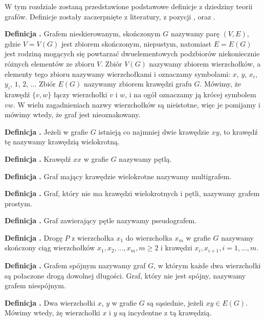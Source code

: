 W tym rozdziale zostaną przedstawione podstawowe definicje z dziedziny teorii grafów.
Definicje zostały zaczerpnięte z literatury, z pozycji \cite{Wloch2008}, \cite{Wilson2012} oraz \cite{Wojciechwoski2013}.

\noindent
\textbf{Definicja .}
\incrementdefinitionIndex
Grafem nieskierowanym, skończonym $G$ nazywamy parę $(V,E)$, gdzie $V = V(G)$ jest zbiorem skończonym, niepustym,
natomiast $E = E(G)$ jest rodziną mogących się powtarzać dwuelementowych podzbiorów niekoniecznie różnych elementów ze zbioru $V$.
Zbiór $V(G)$ nazywamy zbiorem wierzchołków, a elementy tego zbioru nazywamy wierzchołkami i oznaczamy symbolami:
$x$, $y$, $x_i$, $y_i$, $1$, $2$, ... Zbiór $E(G)$ nazywamy zbiorem krawędzi grafu $G$.
Mówimy, że krawędź $\{v, w\}$ łączy wierzchołki $v$ i $w$, i na ogół oznaczamy ją krócej symbolem $vw$.
W wielu zagadnieniach nazwy wierzchołków są nieistotne, więc je pomijamy i mówimy wtedy, że graf jest nieoznakowany.

\noindent
\textbf{Definicja .}
\incrementdefinitionIndex
Jeżeli w grafie $G$ istnieją co najmniej dwie krawędzie $xy$, to krawędź tę nazywamy krawędzią wielokrotną.

\noindent
\textbf{Definicja .}
\incrementdefinitionIndex
Krawędź $xx$ w grafie $G$ nazywamy pętlą.

\noindent
\textbf{Definicja .}
\incrementdefinitionIndex
Graf mający krawędzie wielokrotne nazywamy multigrafem.

\noindent
\textbf{Definicja .}
\incrementdefinitionIndex
Graf, który nie ma krawędzi wielokrotnych i pętli, nazywamy grafem prostym.

\noindent
\textbf{Definicja .}
\incrementdefinitionIndex
Graf zawierający pętle nazywamy pseudografem.

\noindent
\textbf{Definicja .}
\incrementdefinitionIndex
Drogę $P$ z wierzchołka $x_1$ do wierzchołka $x_m$ w grafie $G$ nazywamy skończony ciąg wierzchołków
$x_1, x_2, ..., x_m, m \geqslant 2$ i krawędzi ${x_i, x_{i + 1}}, i = 1, ..., m$.

\noindent
\textbf{Definicja .}
\incrementdefinitionIndex
Grafem spójnym nazywamy graf $G$, w którym każde dwa wierzchołki są połaczone drogą dowolnej długości.
Graf, który nie jest spójny, nazywamy grafem niespójnym.

\noindent
\textbf{Definicja .}
\incrementdefinitionIndex
Dwa wierzchołki $x$, $y$ w grafie $G$ są sąsiednie, jeżeli $xy \in E(G)$.
Mówimy wtedy, żę wierzchołki $x$ i $y$ są incydentne z tą krawędzią.


